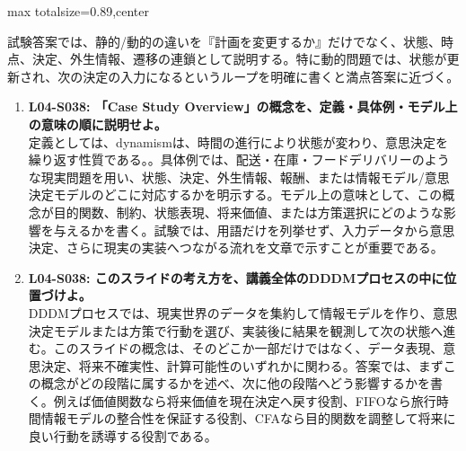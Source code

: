\begin{minipage}[t]{0.58\textwidth}
\begin{adjustbox}{max totalsize={\textwidth}{0.89\textheight},center}
\begin{minipage}{\textwidth}
試験答案では、静的/動的の違いを『計画を変更するか』だけでなく、状態、時点、決定、外生情報、遷移の連鎖として説明する。特に動的問題では、状態が更新され、次の決定の入力になるというループを明確に書くと満点答案に近づく。\par{}\begin{enumerate}\item \textbf{L04-S038: 「Case Study Overview」の概念を、定義・具体例・モデル上の意味の順に説明せよ。}\\定義としては、dynamismは、時間の進行により状態が変わり、意思決定を繰り返す性質である。。具体例では、配送・在庫・フードデリバリーのような現実問題を用い、状態、決定、外生情報、報酬、または情報モデル/意思決定モデルのどこに対応するかを明示する。モデル上の意味として、この概念が目的関数、制約、状態表現、将来価値、または方策選択にどのような影響を与えるかを書く。試験では、用語だけを列挙せず、入力データから意思決定、さらに現実の実装へつながる流れを文章で示すことが重要である。\item \textbf{L04-S038: このスライドの考え方を、講義全体のDDDMプロセスの中に位置づけよ。}\\DDDMプロセスでは、現実世界のデータを集約して情報モデルを作り、意思決定モデルまたは方策で行動を選び、実装後に結果を観測して次の状態へ進む。このスライドの概念は、そのどこか一部だけではなく、データ表現、意思決定、将来不確実性、計算可能性のいずれかに関わる。答案では、まずこの概念がどの段階に属するかを述べ、次に他の段階へどう影響するかを書く。例えば価値関数なら将来価値を現在決定へ戻す役割、FIFOなら旅行時間情報モデルの整合性を保証する役割、CFAなら目的関数を調整して将来に良い行動を誘導する役割である。\end{enumerate}
\end{minipage}
\end{adjustbox}
\end{minipage}


